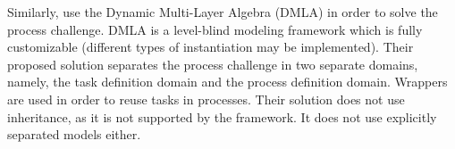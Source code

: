 Similarly, \cite{dmla2019} use the Dynamic Multi-Layer Algebra (DMLA) \parencite{dmla2017} in order to solve the process challenge. DMLA is a level-blind modeling framework which is fully customizable (\eg different types of instantiation may be implemented). Their proposed solution separates the process challenge in two separate domains, namely, the task definition domain and the process definition domain. Wrappers are used in order to reuse tasks in processes. Their solution does not use inheritance, as it is not supported by the framework. It does not use explicitly separated models either.


